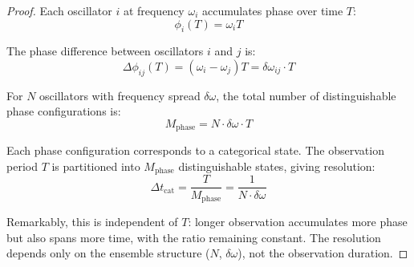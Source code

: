 \begin{proof}
Each oscillator $i$ at frequency $\omega_i$ accumulates phase over time $T$:
\begin{equation}
\phi_i(T) = \omega_i T
\end{equation}

The phase difference between oscillators $i$ and $j$ is:
\begin{equation}
\Delta\phi_{ij}(T) = (\omega_i - \omega_j) T = \delta\omega_{ij} \cdot T
\end{equation}

For $N$ oscillators with frequency spread $\delta\omega$, the total number of distinguishable phase configurations is:
\begin{equation}
M_{\text{phase}} = N \cdot \delta\omega \cdot T
\end{equation}

Each phase configuration corresponds to a categorical state. The observation period $T$ is partitioned into $M_{\text{phase}}$ distinguishable states, giving resolution:
\begin{equation}
\Delta t_{\text{cat}} = \frac{T}{M_{\text{phase}}} = \frac{1}{N \cdot \delta\omega}
\end{equation}

Remarkably, this is independent of $T$: longer observation accumulates more phase but also spans more time, with the ratio remaining constant. The resolution depends only on the ensemble structure ($N$, $\delta\omega$), not the observation duration.
\end{proof}

